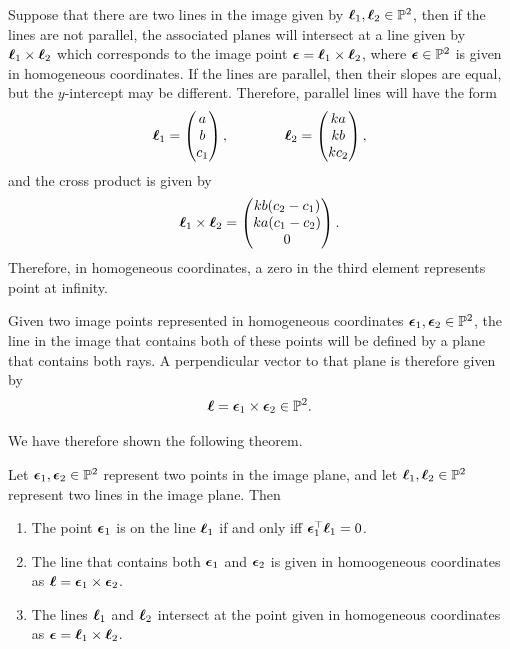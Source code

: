 Suppose that there are two lines in the image given by $\boldsymbol{\ell}_1, \boldsymbol{\ell}_2\in\mathbb{P}^2$, then if the lines are not parallel, the associated planes will intersect at a line given by $\boldsymbol{\ell}_1 \times \boldsymbol{\ell}_2$ which corresponds to the image point $\boldsymbol{\epsilon} = \boldsymbol{\ell}_1\times\boldsymbol{\ell}_2$, where $\boldsymbol{\epsilon}\in\mathbb{P}^2$ is given in homogeneous coordinates.  If the lines are parallel, then their slopes are equal, but the $y$-intercept may be different.  Therefore, parallel lines will have the form
\[
\boldsymbol{\ell}_1 = \begin{pmatrix} a \\ b \\ c_1 \end{pmatrix}, \qquad \qquad \boldsymbol{\ell}_2 = \begin{pmatrix} ka \\ kb \\ kc_2 \end{pmatrix},
\]
and the cross product is given by
\[
\boldsymbol{\ell}_1 \times \boldsymbol{\ell}_2 =  \begin{pmatrix} kb (c_2-c_1) \\ ka(c_1-c_2) \\ 0 \end{pmatrix}.
\]
Therefore, in homogeneous coordinates, a zero in the third element represents point at infinity.~\cite{HartleyZisserman03}

Given two image points represented in homogeneous coordinates $\boldsymbol{\epsilon}_1, \boldsymbol{\epsilon}_2\in\mathbb{P}^2$, the line in the image that contains both of these points will be defined by a plane that contains both rays.  A perpendicular vector to that plane is therefore given by
\[
\boldsymbol{\ell} = \boldsymbol{\epsilon}_1 \times \boldsymbol{\epsilon}_2 \in \mathbb{P}^2.
\]

We have therefore shown the following theorem.
\begin{theorem}
	Let $\boldsymbol{\epsilon}_1, \boldsymbol{\epsilon}_2\in\mathbb{P}^2$ represent two points in the image plane, and let $\boldsymbol{\ell}_1, \boldsymbol{\ell}_2\in\mathbb{P}^2$ represent two lines in the image plane.  Then
	\begin{enumerate}
		\item The point $\boldsymbol{\epsilon}_1$ is on the line $\boldsymbol{\ell}_1$ if and only iff $\boldsymbol{\epsilon}_1^\top \boldsymbol{\ell}_1 = 0$.
		\item The line that contains both $\boldsymbol{\epsilon}_1$ and $\boldsymbol{\epsilon}_2$ is given in homoogeneous coordinates as $\boldsymbol{\ell} = \boldsymbol{\epsilon}_1 \times \boldsymbol{\epsilon}_2$.
		\item The lines $\boldsymbol{\ell}_1$ and $\boldsymbol{\ell}_2$ intersect at the point given in homogeneous coordinates as $\boldsymbol{\epsilon} = \boldsymbol{\ell}_1 \times \boldsymbol{\ell}_2$.
	\end{enumerate} 
\end{theorem}


